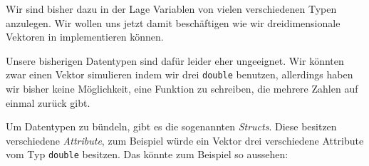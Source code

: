 
Wir sind bisher dazu in der Lage Variablen von vielen verschiedenen Typen anzulegen.
Wir wollen uns jetzt damit beschäftigen wie wir dreidimensionale Vektoren in \Cpp implementieren können.

Unsere bisherigen Datentypen sind dafür leider eher ungeeignet.
Wir könnten zwar einen Vektor simulieren indem wir drei \texttt{double} benutzen, allerdings haben wir bisher keine Möglichkeit, eine Funktion zu schreiben, die mehrere Zahlen auf einmal zurück gibt.

Um Datentypen zu bündeln, gibt es die sogenannten \emph{Structs}.
Diese besitzen verschiedene \emph{Attribute}, zum Beispiel würde ein Vektor drei verschiedene Attribute vom Typ \texttt{double} besitzen.
Das könnte zum Beispiel so aussehen:


%

